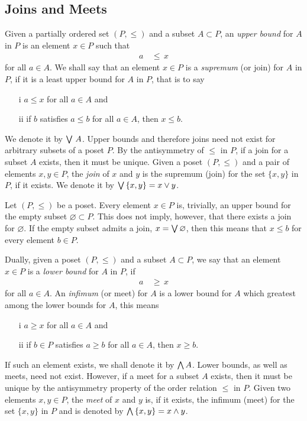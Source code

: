 \subsection{Joins and Meets}
Given a partially ordered set $(P,\leq)$ and a subset $A\subset P$, an
\emph{upper bound} for $A$ in $P$ is an element $x\in P$ such that
\begin{align*}
	a & \,\leq\, x
\end{align*}
%
for all $a\in A$. We shall say that an element $x\in P$ is a \emph{supremum}
(or join) for $A$ in $P$, if it is a least upper bound for $A$ in $P$, that
is to say
\begin{itemize}
	\item[i] $a\leq x$ for all $a\in A$ and
	\item[ii] if $b$ satisfies $a\leq b$ for all $a\in A$, then
		$x\leq b$.
\end{itemize}
%
We denote it by $\bigvee\,A$. Upper bounds and therefore joins need not
exist for arbitrary subsets of a poset $P$. By the antisymmetry of $\leq$
in $P$, if a join for a subset $A$ exists, then it must be unique.
Given a poset $(P,\leq)$ and a pair of elements $x,y\in P$, the
\emph{join} of $x$ and $y$ is the supremum (join) for the set $\{x,y\}$ in
$P$, if it exists. We denote it by $\bigvee\,\{x,y\}=x\vee y$.

\begin{remarkJoinEmptySet}
	Let $(P,\leq)$ be a poset. Every element $x\in P$ is, trivially,
	an upper bound for the empty subset $\varnothing\subset P$. This
	does not imply, however, that there exists a join for $\varnothing$.
	If the empty subset admits a join, $x=\bigvee\varnothing$, then
	this means that $x\leq b$ for every element $b\in P$.
\end{remarkJoinEmptySet}

Dually, given a poset $(P,\leq)$ and a subset $A\subset P$, we say that an
element $x\in P$ is a \emph{lower bound} for $A$ in $P$, if
\begin{align*}
	a & \,\geq\, x
\end{align*}
%
for all $a \in A$. An \emph{infimum} (or meet) for $A$ is a lower bound
for $A$ which greatest among the lower bounds for $A$, this means
\begin{itemize}
	\item[i] $a\geq x$ for all $a\in A$ and
	\item[ii] if $b\in P$ satisfies $a\geq b$ for all $a\in A$, then
		$x\geq b$.
\end{itemize}
%
If such an element exists, we shall denote it by $\bigwedge A$.
Lower bounds, as well as meets, need not exist. However, if a meet for a
subset $A$ exists, then it must be unique by the antisymmetry property
of the order relation $\leq$ in $P$. Given two elements $x,y\in P$,
the \emph{meet} of $x$ and $y$ is, if it exists, the infimum (meet) for
the set $\{x,y\}$ in $P$ and is denoted by
$\bigwedge\,\{x,y\}=x\wedge y$.

